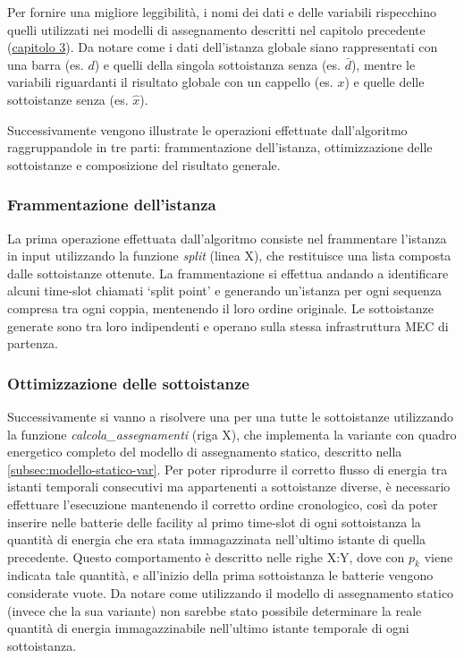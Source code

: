 Per fornire una migliore leggibilità, i nomi dei dati e delle variabili rispecchino quelli utilizzati nei modelli di assegnamento descritti nel capitolo precedente (\hyperref[cap:modelli-ottimizzazione]{capitolo 3}). Da notare come i dati dell'istanza globale siano rappresentati con una barra (es. $d$) e quelli della singola sottoistanza senza (es. $\bar{d}$), mentre le variabili riguardanti il risultato globale con un cappello (es. $x$) e quelle delle sottoistanze senza (es. $\hat{x}$).

Successivamente vengono illustrate le operazioni effettuate dall'algoritmo raggruppandole in tre parti: frammentazione dell'istanza, ottimizzazione delle sottoistanze e composizione del risultato generale.

\subsubsection{Frammentazione dell'istanza}

La prima operazione effettuata dall'algoritmo consiste nel frammentare l'istanza in input utilizzando la funzione \textit{split} (linea X), che restituisce una lista composta dalle sottoistanze ottenute. La frammentazione si effettua andando a identificare alcuni time-slot chiamati `split point' e generando un'istanza per ogni sequenza compresa tra ogni coppia, mentenendo il loro ordine originale. Le sottoistanze generate sono tra loro indipendenti e operano sulla stessa infrastruttura MEC di partenza.

\subsubsection{Ottimizzazione delle sottoistanze}

Successivamente si vanno a risolvere una per una tutte le sottoistanze utilizzando la funzione \textit{calcola\_assegnamenti} (riga X), che implementa la variante con quadro energetico completo del modello di assegnamento statico, descritto nella \autoref{subsec:modello-statico-var}. Per poter riprodurre il corretto flusso di energia tra istanti temporali consecutivi ma appartenenti a sottoistanze diverse, è necessario effettuare l'esecuzione mantenendo il corretto ordine cronologico, così da poter inserire nelle batterie delle facility al primo time-slot di ogni sottoistanza la quantità di energia che era stata immagazzinata nell'ultimo istante di quella precedente. Questo comportamento è descritto nelle righe X:Y, dove con $p_k$ viene indicata tale quantità, e all'inizio della prima sottoistanza le batterie vengono considerate vuote. Da notare come utilizzando il modello di assegnamento statico (invece che la sua variante) non sarebbe stato possibile determinare la reale quantità di energia immagazzinabile nell'ultimo istante temporale di ogni sottoistanza.

